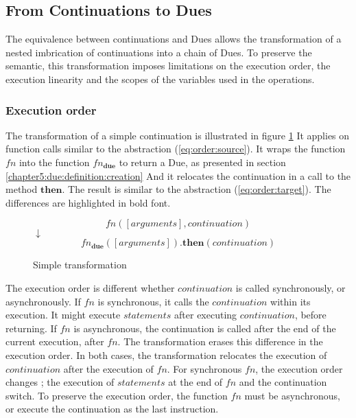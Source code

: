\subsection{From Continuations to Dues} \label{chapter5:due:equivalence}

The equivalence between continuations and Dues allows the transformation of a nested imbrication of continuations into a chain of Dues.
To preserve the semantic, this transformation imposes limitations on the execution order, the execution linearity and the scopes of the variables used in the operations.

\subsubsection{Execution order}

The transformation of a simple continuation is illustrated in figure \ref{fig:then-transform}
It applies on function calls similar to the abstraction (\ref{eq:order:source}).
It wraps the function $fn$ into the function $fn_\textbf{due}$ to return a Due, as presented in section \ref{chapter5:due:definition:creation}
And it relocates the continuation in a call to the method $\textbf{then}$.
The result is similar to the abstraction (\ref{eq:order:target}).
The differences are highlighted in bold font.

\begin{figure}[h!]
\centering
\begin{equation} \label{eq:order:source}
fn([arguments], continuation)
\end{equation}
$\downarrow$
\begin{equation} \label{eq:order:target}
fn_\textbf{due}([arguments])\textbf{.then}(continuation)
\end{equation}
\caption{Simple transformation}
\label{fig:then-transform}
\end{figure}

The execution order is different whether $continuation$ is called synchronously, or asynchronously.
If $fn$ is synchronous, it calls the $continuation$ within its execution.
It might execute $statements$ after executing $continuation$, before returning.
If $fn$ is asynchronous, the continuation is called after the end of the current execution, after $fn$.
The transformation erases this difference in the execution order.
In both cases, the transformation relocates the execution of $continuation$ after the execution of $fn$.
For synchronous $fn$, the execution order changes ; the execution of $statements$ at the end of $fn$ and the continuation switch.
To preserve the execution order, the function $fn$ must be asynchronous, or execute the continuation as the last instruction.



